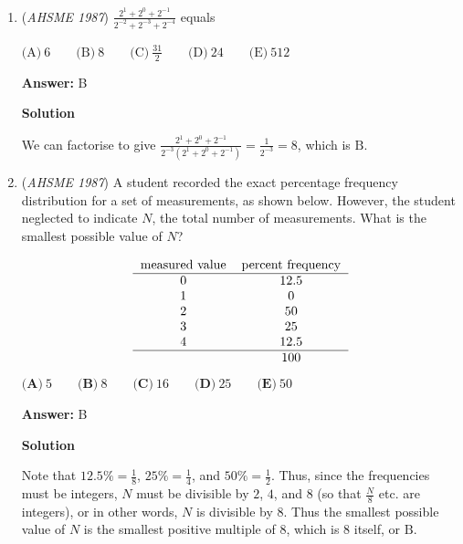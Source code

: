\begin{enumerate}
 \textbf{Answer: }C



\textbf{Solution}

List out all numbers that have 7 as the ones digit less than 100: ${7, 17, 27, 37, 47, 57, 67, 77, 87, 97}$. Only $7, 17,37, 47,67,$ and $97$ are prime. Thus, it is $\boxed{C}$. -slackroadia

 


	\item (\textit{AHSME 1987}) $\frac{2^1+2^0+2^{-1}}{2^{-2}+2^{-3}+2^{-4}}$ equals 


 $\text{(A)} \ 6 \qquad  \text{(B)} \ 8 \qquad  \text{(C)} \ \frac{31}{2} \qquad  \text{(D)} \ 24 \qquad  \text{(E)} \ 512$

 \textbf{Answer: }B



\textbf{Solution}

We can factorise to give $\frac{2^1 + 2^0 + 2^{-1}}{2^{-3}(2^1 + 2^0 + 2^{-1})} = \frac{1}{2^{-3}} = 8$, which is $\boxed{\text{B}}$.

 


	\item (\textit{AHSME 1987}) A student recorded the exact percentage frequency distribution for a set of measurements, as shown below. 
However, the student neglected to indicate $N$, the total number of measurements. What is the smallest possible value of $N$?


 
 \[\begin{tabular}{c c}\text{measured value}&\text{percent frequency}\\ \hline 0 & 12.5\\ 1 & 0\\ 2 & 50\\ 3 & 25\\ 4 & 12.5\\ \hline\ & 100\\ \end{tabular}\]
$\textbf{(A)}\ 5 \qquad \textbf{(B)}\ 8 \qquad \textbf{(C)}\ 16 \qquad \textbf{(D)}\ 25 \qquad \textbf{(E)}\ 50$

 \textbf{Answer: }B



\textbf{Solution}

Note that $12.5\% = \frac{1}{8}$, $25\% = \frac{1}{4}$, and $50\% = \frac{1}{2}$. Thus, since the frequencies must be integers, $N$ must be divisible by $2$, $4$, and $8$ (so that $\frac{N}{8}$ etc. are integers), or in other words, $N$ is divisible by $8$. Thus the smallest possible value of $N$ is the smallest positive multiple of $8$, which is $8$ itself, or $\boxed{\text{B}}$.


\end{enumerate}
